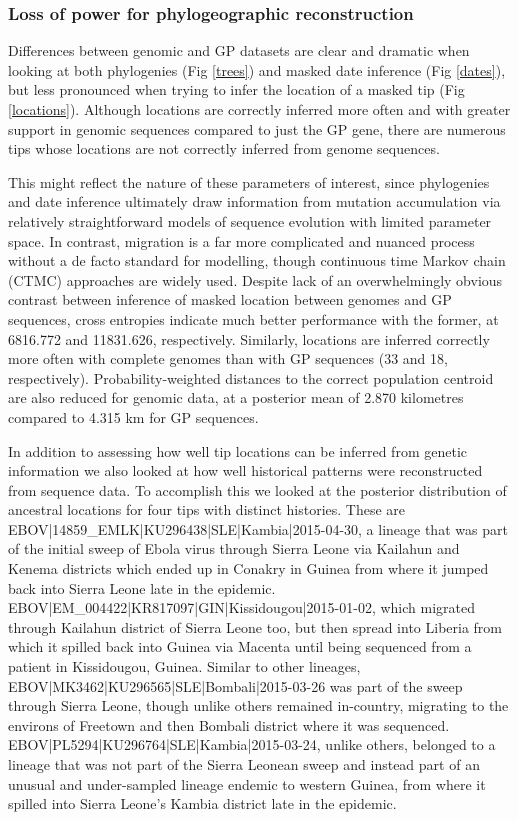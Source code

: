 \documentclass[11pt,oneside,letterpaper]{article}
\begin{document}
\subsubsection*{Loss of power for phylogeographic reconstruction}

Differences between genomic and GP datasets are clear and dramatic when looking at both phylogenies (Fig \ref{trees}) and masked date inference (Fig \ref{dates}), but less pronounced when trying to infer the location of a masked tip (Fig \ref{locations}).
Although locations are correctly inferred more often and with greater support in genomic sequences compared to just the GP gene, there are numerous tips whose locations are not correctly inferred from genome sequences.

This might reflect the nature of these parameters of interest, since phylogenies and date inference ultimately draw information from mutation accumulation via relatively straightforward models of sequence evolution with limited parameter space.
In contrast, migration is a far more complicated and nuanced process without a de facto standard for modelling, though continuous time Markov chain (CTMC) approaches are widely used.
Despite lack of an overwhelmingly obvious contrast between inference of masked location between genomes and GP sequences, cross entropies indicate much better performance with the former, at 6816.772 and 11831.626, respectively.
Similarly, locations are inferred correctly more often with complete genomes than with GP sequences (33 and 18, respectively).
Probability-weighted distances to the correct population centroid are also reduced for genomic data, at a posterior mean of 2.870 kilometres compared to 4.315 km for GP sequences.

In addition to assessing how well tip locations can be inferred from genetic information we also looked at how well historical patterns were reconstructed from sequence data.
To accomplish this we looked at the posterior distribution of ancestral locations for four tips with distinct histories.
These are EBOV|14859\_EMLK|KU296438|SLE|Kambia|2015-04-30, a lineage that was part of the initial sweep of Ebola virus through Sierra Leone via Kailahun and Kenema districts which ended up in Conakry in Guinea from where it jumped back into Sierra Leone late in the epidemic.
EBOV|EM\_004422|KR817097|GIN|Kissidougou|2015-01-02, which migrated through Kailahun district of Sierra Leone too, but then spread into Liberia from which it spilled back into Guinea via Macenta until being sequenced from a patient in Kissidougou, Guinea.
Similar to other lineages, EBOV|MK3462|KU296565|SLE|Bombali|2015-03-26 was part of the sweep through Sierra Leone, though unlike others remained in-country, migrating to the environs of Freetown and then Bombali district where it was sequenced.
EBOV|PL5294|KU296764|SLE|Kambia|2015-03-24, unlike others, belonged to a lineage that was not part of the Sierra Leonean sweep and instead part of an unusual and under-sampled lineage endemic to western Guinea, from where it spilled into Sierra Leone's Kambia district late in the epidemic.
\end{document}

